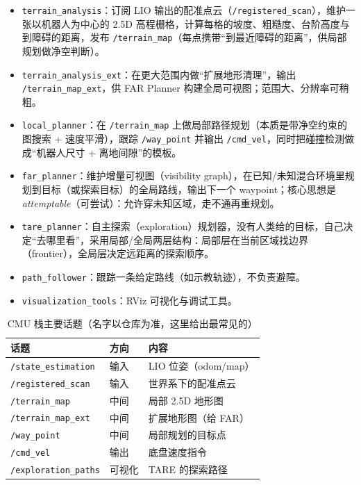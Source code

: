 \begin{itemize}
  \item \texttt{terrain\_analysis}：订阅 LIO 输出的配准点云（\texttt{/registered\_scan}），维护一张以机器人为中心的 2.5D 高程栅格，计算每格的坡度、粗糙度、台阶高度与到障碍的距离，发布 \texttt{/terrain\_map}（每点携带“到最近障碍的距离”，供局部规划做净空判断）。
  \item \texttt{terrain\_analysis\_ext}：在更大范围内做“扩展地形清理”，输出 \texttt{/terrain\_map\_ext}，供 FAR Planner 构建全局可视图；范围大、分辨率可稍粗。
  \item \texttt{local\_planner}：在 \texttt{/terrain\_map} 上做局部路径规划（本质是带净空约束的图搜索 + 速度平滑），跟踪 \texttt{/way\_point} 并输出 \texttt{/cmd\_vel}，同时把碰撞检测做成“机器人尺寸 + 离地间隙”的模板。
  \item \texttt{far\_planner}：维护增量可视图（visibility graph），在已知/未知混合环境里规划到目标（或探索目标）的全局路线，输出下一个 waypoint；核心思想是 \emph{attemptable}（可尝试）：允许穿未知区域，走不通再重规划。
  \item \texttt{tare\_planner}：自主探索（exploration）规划器，没有人类给的目标，自己决定“去哪里看”，采用局部/全局两层结构：局部层在当前区域找边界（frontier），全局层决定远距离的探索顺序。
  \item \texttt{path\_follower}：跟踪一条给定路线（如示教轨迹），不负责避障。
  \item \texttt{visualization\_tools}：RViz 可视化与调试工具。
\end{itemize}

\begin{table}[htbp]
  \centering
  \caption{CMU 栈主要话题（名字以仓库为准，这里给出最常见的）}
  \label{tab:21-topics}
  \small
  \begin{tabular}{lll}
    \toprule
    话题 & 方向 & 内容 \\
    \midrule
    \texttt{/state\_estimation} & 输入 & LIO 位姿（odom/map） \\
    \texttt{/registered\_scan} & 输入 & 世界系下的配准点云 \\
    \texttt{/terrain\_map} & 中间 & 局部 2.5D 地形图 \\
    \texttt{/terrain\_map\_ext} & 中间 & 扩展地形图（给 FAR） \\
    \texttt{/way\_point} & 中间 & 局部规划的目标点 \\
    \texttt{/cmd\_vel} & 输出 & 底盘速度指令 \\
    \texttt{/exploration\_paths} & 可视化 & TARE 的探索路径 \\
    \bottomrule
  \end{tabular}
\end{table}

